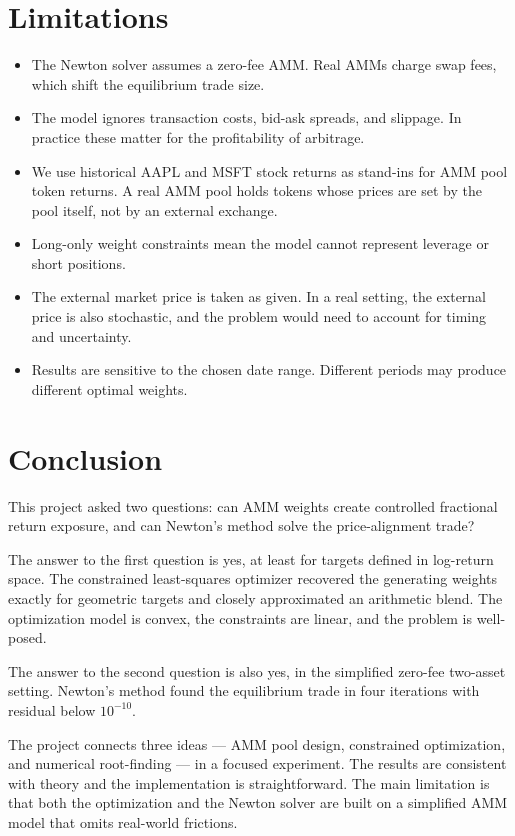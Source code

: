 \documentclass[12pt]{article}
\begin{document}
\section{Limitations}

\begin{itemize}
    \item The Newton solver assumes a zero-fee AMM. Real AMMs charge swap fees, which shift the equilibrium trade size.
    \item The model ignores transaction costs, bid-ask spreads, and slippage. In practice these matter for the profitability of arbitrage.
    \item We use historical AAPL and MSFT stock returns as stand-ins for AMM pool token returns. A real AMM pool holds tokens whose prices are set by the pool itself, not by an external exchange.
    \item Long-only weight constraints mean the model cannot represent leverage or short positions.
    \item The external market price is taken as given. In a real setting, the external price is also stochastic, and the problem would need to account for timing and uncertainty.
    \item Results are sensitive to the chosen date range. Different periods may produce different optimal weights.
\end{itemize}

\section{Conclusion}

This project asked two questions: can AMM weights create controlled fractional return exposure, and can Newton's method solve the price-alignment trade?

The answer to the first question is yes, at least for targets defined in log-return space. The constrained least-squares optimizer recovered the generating weights exactly for geometric targets and closely approximated an arithmetic blend. The optimization model is convex, the constraints are linear, and the problem is well-posed.

The answer to the second question is also yes, in the simplified zero-fee two-asset setting. Newton's method found the equilibrium trade in four iterations with residual below $10^{-10}$.

The project connects three ideas --- AMM pool design, constrained optimization, and numerical root-finding --- in a focused experiment. The results are consistent with theory and the implementation is straightforward. The main limitation is that both the optimization and the Newton solver are built on a simplified AMM model that omits real-world frictions.
\end{document}
